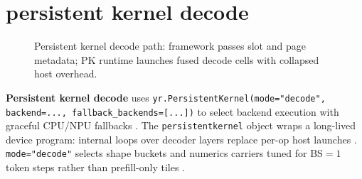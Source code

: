 \section{persistent kernel decode}
\label{sec:ch29_persistent_kernel_decode}


\begin{figure}[t]
\centering
{}
\caption{Persistent kernel decode path: framework passes slot and page metadata; PK runtime launches fused decode cells with collapsed host overhead.}
\label{fig:persistent_kernel_decode_architecture}
\end{figure}

\textbf{Persistent kernel decode} uses \texttt{yr.PersistentKernel(mode="decode", backend=..., fallback\_backends=[...])} to select backend execution with graceful CPU/NPU fallbacks \citep{yirage2026,chen2020compilerbasedhardw,patel2025llminference,kwon2023vllm,taxbreak2026,memoryfloor2026,liu2024deepseekv3,nvidia2024cudagraphs,amd2024xdna,amd2024aie,dlbook,dao2022flashattention,semianalysis2024tma,dao2023flashdecoding,nvidia2022hopper}. The \texttt{persistentkernel} object wraps a long-lived device program: internal loops over decoder layers replace per-op host launches \citep{yirage2026,chen2020compilerbasedhardw,taxbreak2026,memoryfloor2026,patel2025llminference,nvidia2024cudagraphs,dao2022flashattention,dlbook}. \texttt{mode="decode"} selects shape buckets and numerics carriers tuned for BS${=}1$ token steps rather than prefill-only tiles \citep{patel2025llminference,dao2022flashattention,dao2023flashdecoding,memoryfloor2026,yirage2026,chen2020compilerbasedhardw,kwon2023vllm,taxbreak2026,dlbook}.


